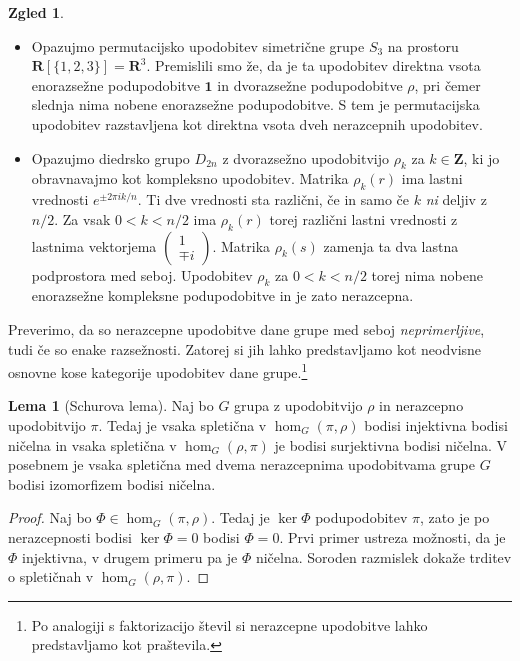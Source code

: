 \documentclass[11pt]{book}
\def\ZZ{\mathbf{Z}}
\def\RR{\mathbf{R}}
\def\oneone{\mathbf{1}}
\theoremstyle{definition}
\theoremstyle{zgled}
\newtheorem{zgled}[theorem]{Zgled}
\theoremstyle{zgledbrezstevilke}
\theoremstyle{odprtproblem}
\theoremstyle{domacanaloga}
\newenvironment{dokaz}
    {\color{siva}\begin{proof}}
    {\end{proof}}
\theoremstyle{izrek}
\newtheorem{lema}[theorem]{Lema}
\begin{document}
\begin{zgled} \leavevmode
\begin{itemize}
\item Opazujmo permutacijsko upodobitev simetrične grupe $S_3$ na prostoru $\RR[\{ 1,2,3 \}] = \RR^3$. Premislili smo že, da je ta upodobitev direktna vsota enorazsežne podupodobitve $\oneone$ in dvorazsežne podupodobitve $\rho$, pri čemer slednja nima nobene enorazsežne podupodobitve. S tem je permutacijska upodobitev razstavljena kot direktna vsota dveh nerazcepnih upodobitev.

\item Opazujmo diedrsko grupo $D_{2n}$ z dvorazsežno upodobitvijo $\rho_k$ za $k \in \ZZ$, ki jo obravnavajmo kot kompleksno upodobitev. Matrika $\rho_k(r)$ ima lastni vrednosti $e^{\pm 2 \pi i k / n}$. Ti dve vrednosti sta različni, če in samo če $k$ \emph{ni} deljiv z $n/2$. Za vsak $0 < k < n/2$ ima $\rho_k(r)$ torej različni lastni vrednosti z lastnima vektorjema $\left( \begin{smallmatrix} 1 \\ \mp i \end{smallmatrix} \right)$. Matrika $\rho_k(s)$ zamenja ta dva lastna podprostora med seboj. Upodobitev $\rho_k$ za $0 < k < n/2$ torej nima nobene enorazsežne kompleksne podupodobitve in je zato nerazcepna.
\end{itemize}
\end{zgled}

Preverimo, da so nerazcepne upodobitve dane grupe med seboj \emph{neprimerljive}, tudi če so enake razsežnosti. Zatorej si jih lahko predstavljamo kot neodvisne osnovne kose kategorije upodobitev dane grupe.\footnote{Po analogiji s faktorizacijo števil si nerazcepne upodobitve lahko predstavljamo kot praštevila.} 

\begin{lema}[Schurova lema]
Naj bo $G$ grupa z upodobitvijo $\rho$ in nerazcepno upodobitvijo $\pi$. Tedaj je vsaka spletična v $\hom_G(\pi, \rho)$ bodisi injektivna bodisi ničelna in vsaka spletična v $\hom_G(\rho, \pi)$ je bodisi surjektivna bodisi ničelna. V posebnem je vsaka spletična med dvema nerazcepnima upodobitvama grupe $G$ bodisi izomorfizem bodisi ničelna.
\end{lema}
\begin{dokaz}
Naj bo $\Phi \in \hom_G(\pi, \rho)$. Tedaj je $\ker \Phi$ podupodobitev $\pi$, zato je po nerazcepnosti bodisi $\ker \Phi = 0$ bodisi $\Phi = 0$. Prvi primer ustreza možnosti, da je $\Phi$ injektivna, v drugem primeru pa je $\Phi$ ničelna. Soroden razmislek dokaže trditev o spletičnah v $\hom_G(\rho, \pi)$. 
\end{dokaz}
\end{document}
